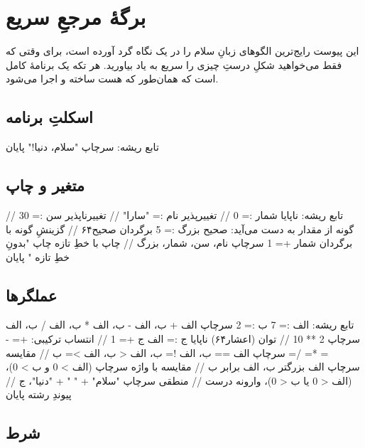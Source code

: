 \chapter{برگهٔ مرجعِ سریع}%
\label{app:cheatsheet}

این پیوست رایج‌ترین الگوهای زبانِ سلام را در یک نگاه گرد آورده است، برای
وقتی که فقط می‌خواهید شکلِ درستِ چیزی را سریع به یاد بیاورید. هر تکه یک
برنامهٔ کامل است که همان‌طور که هست ساخته و اجرا می‌شود.

\section{اسکلتِ برنامه}

\begin{salamfa}
تابع ریشه:
    سرچاپ "سلام، دنیا!"
پایان
\end{salamfa}

\section{متغیر و چاپ}

\begin{salamfa}
تابع ریشه:
    ناپایا شمار := 0                // تغییرپذیر
    نام := "سارا"                  // تغییرناپذیر
    سن := 30                       // گونه از مقدار به دست می‌آید: صحیح
    بزرگ := 5 برگردان صحیح۶۴       // گزینشِ گونه با برگردان
    شمار += 1
    سرچاپ نام، سن، شمار، بزرگ       // چاپ با خطِ تازه
    چاپ "بدونِ خطِ تازه "
پایان
\end{salamfa}

\section{عملگرها}

\begin{salamfa}
تابع ریشه:
    الف := 7
    ب := 2
    سرچاپ الف + ب، الف - ب، الف * ب، الف / ب، الف %
    سرچاپ 2 ** 10                                    // توان (اعشار۶۴)
    ناپایا ج := الف
    ج += 1                                           // انتساب ترکیبی: += -= *= /= %
    سرچاپ الف == ب، الف != ب، الف < ب، الف >= ب       // مقایسه
    سرچاپ الف بزرگتر ب، الف برابر ب                   // مقایسه با واژه
    سرچاپ (الف > 0 و ب > 0)، (الف < 0 یا ب < 0)، وارونه درست   // منطقی
    سرچاپ "سلام" + " " + "دنیا"، ج                    // پیوندِ رشته
پایان
\end{salamfa}

\section{شرط}

